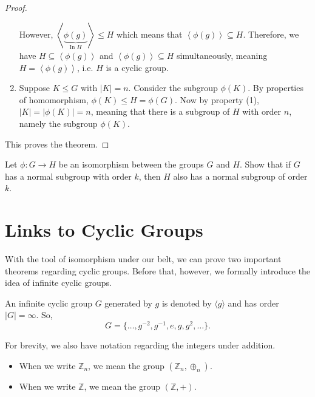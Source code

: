 \begin{proof}
\begin{enumerate}
        However, $\left\langle \underbrace{\phi(g)}_{\text{In }H} \right\rangle \leq H$ which means that $\left\langle \phi(g) \right\rangle \subseteq H$. Therefore, we have $H \subseteq \left\langle \phi(g) \right\rangle$ and $\left\langle \phi(g) \right\rangle \subseteq H$ simultaneously, meaning $H = \left\langle \phi(g) \right\rangle$, i.e. $H$ is a cyclic group.

        \item Suppose $K \leq G$ with $|K| = n$. Consider the subgroup $\phi(K)$. By properties of homomorphism, $\phi(K) \leq H = \phi(G)$. Now by property (1), $|K| = |\phi(K)| = n$, meaning that there is a subgroup of $H$ with order $n$, namely the subgroup $\phi(K)$.
    \end{enumerate}

    This proves the theorem.
\end{proof}

\begin{exercise}
    Let $\phi: G \to H$ be an isomorphism between the groups $G$ and $H$. Show that if $G$ has a normal subgroup with order $k$, then $H$ also has a normal subgroup of order $k$.
\end{exercise}

\section{Links to Cyclic Groups}
With the tool of isomorphism under our belt, we can prove two important theorems regarding cyclic groups. Before that, however, we formally introduce the idea of infinite cyclic groups.
\begin{definition}
    An infinite cyclic group $G$ generated by $g$ is denoted by $\langle g \rangle$ and has order $|G| = \infty$. So,
    \[
        G = \{\dots, g^{-2}, g^{-1}, e, g, g^2, \dots\}.
    \]
\end{definition}

For brevity, we also have notation regarding the integers under addition.
\begin{itemize}
    \item When we write $\mathbb{Z}_n$, we mean the group $(\mathbb{Z}_n, \oplus_n)$.
    \item When we write $\mathbb{Z}$, we mean the group $(\mathbb{Z}, +)$.
\end{itemize}

